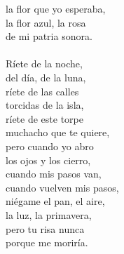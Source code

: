 \begin{Parallel}{0.48\textwidth}{0.48\textwidth}
{la flor que yo esperaba,\\ 
la flor azul, la rosa\\ 
de mi patria sonora.\\ 
\-\ \\ Ríete de la noche,\\ 
del día, de la luna,\\ 
ríete de las calles\\ 
torcidas de la isla,\\ 
ríete de este torpe\\ 
muchacho que te quiere,\\ 
pero cuando yo abro\\ 
los ojos y los cierro,\\ 
cuando mis pasos van,\\ 
cuando vuelven mis pasos,\\ 
niégame el pan, el aire,\\ 
la luz, la primavera,\\ 
pero tu risa nunca\\ 
porque me moriría.}
\ParallelPar
\end{Parallel}
\vfill